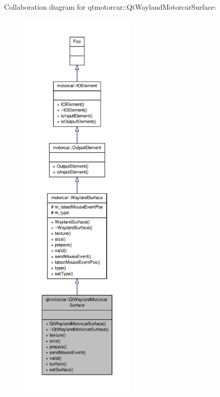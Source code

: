 Collaboration diagram for qtmotorcar\-:\-:Qt\-Wayland\-Motorcar\-Surface\-:
\nopagebreak
\begin{figure}[H]
\begin{center}
\leavevmode
\includegraphics[height=550pt]{classqtmotorcar_1_1QtWaylandMotorcarSurface__coll__graph}
\end{center}
\end{figure}

